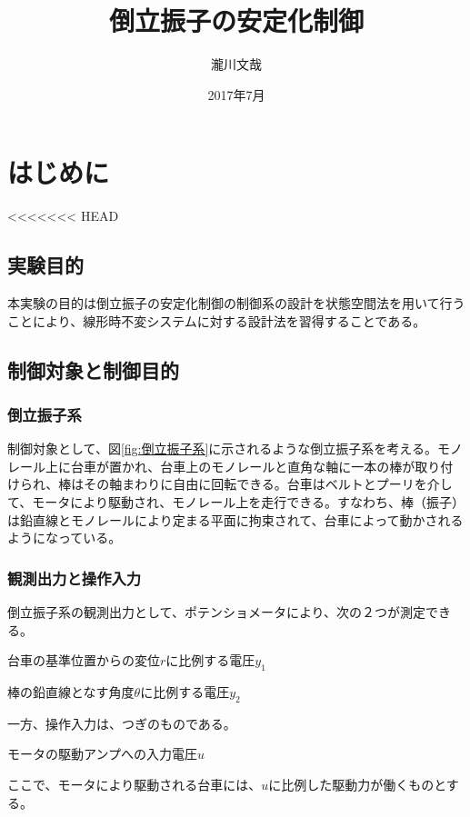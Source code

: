 \documentclass[a4j,11pt,twoside]{ujbook}
\begin{document}
\title{倒立振子の安定化制御}
\author{瀧川文哉}
\date{2017年7月}
\maketitle
\tableofcontents
\listoffigures
\listoftables
\cleardoublepage
{}
\chapter{はじめに}
<<<<<<< HEAD
\section{実験目的}
本実験の目的は倒立振子の安定化制御の制御系の設計を状態空間法を用いて行うことにより、線形時不変システムに対する設計法を習得することである。
\section{制御対象と制御目的}
\subsection{倒立振子系}
制御対象として、図\ref{fig:倒立振子系}に示されるような倒立振子系を考える。モノレール上に台車が置かれ、台車上のモノレールと直角な軸に一本の棒が取り付けられ、棒はその軸まわりに自由に回転できる。台車はベルトとプーリを介して、モータにより駆動され、モノレール上を走行できる。すなわち、棒（振子）は鉛直線とモノレールにより定まる平面に拘束されて、台車によって動かされるようになっている。

\subsection{観測出力と操作入力}
倒立振子系の観測出力として、ポテンショメータにより、次の２つが測定できる。
\begin{description}
	\setlength{\itemindent}{0pt}
	\item[1°] 台車の基準位置からの変位$r$に比例する電圧$y_1$
	\item[2°] 棒の鉛直線となす角度$\theta$に比例する電圧$y_2$
\end{description}
一方、操作入力は、つぎのものである。
\begin{description}
	\setlength{\itemindent}{0pt}
	\item[1°] モータの駆動アンプへの入力電圧$u$
\end{description}
ここで、モータにより駆動される台車には、$u$に比例した駆動力が働くものとする。
\end{document}
